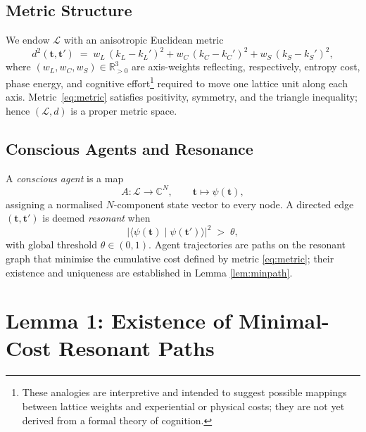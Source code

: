 \documentclass[11pt]{article}
\begin{document}
\subsection{Metric Structure}\label{sec:metric}
We endow $\mathcal L$ with an anisotropic Euclidean metric
\begin{equation}
  d^{2}(\mathbf t,\mathbf t') \;=\;
  w_L\,(k_L-k_L')^{2}
  + w_C\,(k_C-k_C')^{2}
  + w_S\,(k_S-k_S')^{2},
  \label{eq:metric}
\end{equation}
where $(w_L,w_C,w_S)\in\mathbb R_{>0}^{3}$ are axis-weights reflecting,
respectively, entropy cost, phase energy, and cognitive effort\footnote{These analogies are interpretive and intended to suggest possible mappings between lattice weights and experiential or physical costs; they are not yet derived from a formal theory of cognition.}
required to move one lattice unit along each axis.
Metric~\eqref{eq:metric} satisfies positivity, symmetry, and the triangle inequality;
hence $(\mathcal L,d)$ is a proper metric space.

\subsection{Conscious Agents and Resonance}\label{sec:agents}
A \emph{conscious agent} is a map
\[
  A\colon \mathcal L \longrightarrow \mathbb C^{N},
  \qquad
  \mathbf t \mapsto \psi(\mathbf t),
\]
assigning a normalised $N$-component state vector to every node.
A directed edge $(\mathbf t,\mathbf t')$ is deemed \emph{resonant} when
\begin{equation}
  \bigl|\langle \psi(\mathbf t)\mid\psi(\mathbf t')\rangle\bigr|^{2}
  \;>\;\theta,
  \label{eq:res-ineq}
\end{equation}
with global threshold $\theta\in(0,1)$.  Agent trajectories are paths on
the resonant graph that minimise the cumulative cost defined by metric
\eqref{eq:metric}; their existence and uniqueness are established in
Lemma \ref{lem:minpath}.

\section{Lemma 1: Existence of Minimal-Cost Resonant Paths}\label{sec:lemma1}
\end{document}
